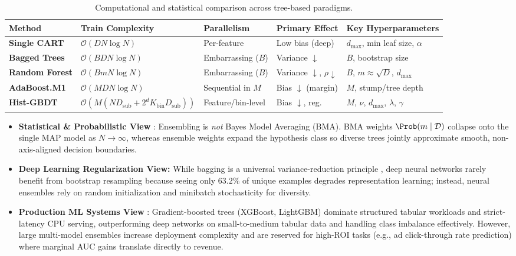 \documentclass[../../../../master.tex]{subfiles}
\begin{document}
\begin{table}[htbp]
\centering
\small
\caption{Computational and statistical comparison across tree-based paradigms.}
\label{tab:trees:complexity}
\begin{tabularx}{\textwidth}{@{} >{\bfseries}l l l l X @{}}
\toprule
Method & Train Complexity & Parallelism & Primary Effect & Key Hyperparameters \\
\midrule
Single CART & $\mathcal{O}(D N \log N)$ & Per-feature & Low bias (deep) & $d_{\max}$, min leaf size, $\alpha$ \\
Bagged Trees & $\mathcal{O}(B D N \log N)$ & Embarrassing ($B$) & Variance $\downarrow$ & $B$, bootstrap size \\
Random Forest & $\mathcal{O}(B m N \log N)$ & Embarrassing ($B$) & Variance $\downarrow$, $\rho \downarrow$ & $B$, $m \approx \sqrt{D}$, $d_{\max}$ \\
AdaBoost.M1 & $\mathcal{O}(M D N \log N)$ & Sequential in $M$ & Bias $\downarrow$ (margin) & $M$, stump/tree depth \\
Hist-GBDT & $\mathcal{O}(M (N D_{\mathrm{sub}} + 2^{d} K_{\mathrm{bin}} D_{\mathrm{sub}}))$ & Feature/bin-level & Bias $\downarrow$, reg. & $M$, $\nu$, $d_{\max}$, $\lambda$, $\gamma$ \\
\bottomrule
\end{tabularx}
\end{table}

\begin{crossbook}
\label{box:trees:synthesis}
\begin{itemize}[leftmargin=1.4em, itemsep=0.3em]
  \item \textbf{Statistical \& Probabilistic View} : Ensembling is \emph{not} Bayes Model Averaging (BMA). BMA weights $\Prob(m \mid \mathcal{D})$ collapse onto the single MAP model as $N \to \infty$, whereas ensemble weights expand the hypothesis class so diverse trees jointly approximate smooth, non-axis-aligned decision boundaries.
  \item \textbf{Deep Learning Regularization View:} While bagging is a universal variance-reduction principle , deep neural networks rarely benefit from bootstrap resampling because seeing only $63.2\%$ of unique examples degrades representation learning; instead, neural ensembles rely on random initialization and minibatch stochasticity for diversity.
  \item \textbf{Production ML Systems View} : Gradient-boosted trees (XGBoost, LightGBM) dominate structured tabular workloads and strict-latency CPU serving, outperforming deep networks on small-to-medium tabular data and handling class imbalance effectively. However, large multi-model ensembles increase deployment complexity and are reserved for high-ROI tasks (e.g., ad click-through rate prediction) where marginal AUC gains translate directly to revenue.
\end{itemize}
\end{crossbook}
\end{document}

